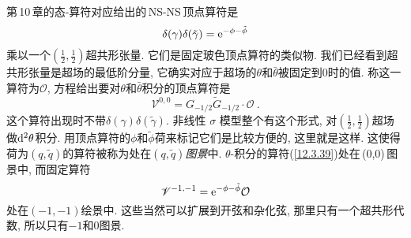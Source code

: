 第\,10\,章的态-算符对应给出的\,NS-NS\,顶点算符是
\begin{equation}
    \delta(\gamma)\delta(\tilde{\gamma}) = \mathrm{e}^{-\phi-\tilde{\phi}} \label{12.3.38}
\end{equation}
乘以一个$ (\tfrac{1}{2},\tfrac{1}{2}) $超共形张量.  它们是固定玻色顶点算符的类似物. 我们已经看到超共形张量是超场的最低阶分量, 它确实对应于超场的$ \theta $和$ \bar{\theta} $被固定到$ 0 $时的值. 称这一算符为$ \mathcal{O}$, 方程给出要对$ \theta $和$ \bar{\theta} $积分的顶点算符是
\begin{equation}
    \mathscr{V}^{0,0}= G_{-1/2}\tilde{G}_{-1/2} \cdot\mathcal{O} \:. \label{12.3.39}
\end{equation}
这个算符出现时不带$ \delta(\gamma)\delta(\tilde{\gamma})$. 非线性 $\sigma$ 模型整个有这个形式, 对$ (\tfrac{1}{2},\tfrac{1}{2}) $超场做$ \mathrm{d}^{2}\theta $积分. 用顶点算符的$ \phi $和$ \tilde{\phi} $荷来标记它们是比较方便的, 这里就是这样. 这使得荷为$ (q,\tilde{q}) $的算符被称为处在$ (q,\tilde{q}) ${\emph{图景}}中. $\theta $-积分的算符(\ref{12.3.39})处在\,(0,0)\,图景中, 而固定算符
\begin{equation}
    \mathscr{V}^{-1,-1} = \mathrm{e}^{-\phi-\tilde{\phi}}\mathcal{O} \label{12.3.40}
\end{equation}
处在$(-1,-1)$绘景中. 这些当然可以扩展到开弦和杂化弦, 那里只有一个超共形代数, 所以只有$ -1 $和$ 0 $图景.

